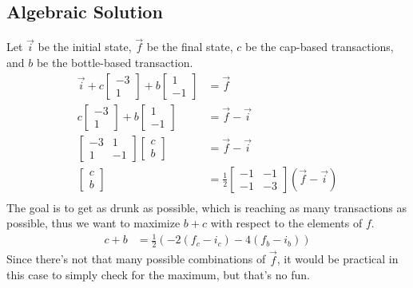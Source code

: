 \documentclass[letterpaper, 12pt]{article}
\begin{document}
\subsection{Algebraic Solution}
Let $\vec{i}$ be the initial state, $\vec{f}$ be the final state, $c$ be the cap-based transactions, and $b$ be the bottle-based transaction.
\begin{align*}
    \vec{i}
    + c
    \begin{bmatrix}
        -3\\
        1
    \end{bmatrix}
    + b
    \begin{bmatrix}
        1\\
        -1
    \end{bmatrix}
    &=
    \vec{f}\\
    c
    \begin{bmatrix}
        -3\\
        1
    \end{bmatrix}
    + b
    \begin{bmatrix}
        1\\
        -1
    \end{bmatrix}
    &=
    \vec{f} - \vec{i}\\
    \begin{bmatrix}
        -3 & 1\\
         1 &-1
    \end{bmatrix}
    \begin{bmatrix}
        c\\
        b
    \end{bmatrix}
    &=
    \vec{f} - \vec{i}\\
    \begin{bmatrix}
        c\\
        b
    \end{bmatrix}
    &=
    \frac{1}{2}
    \begin{bmatrix}
        -1 &-1\\
        -1 &-3
    \end{bmatrix}
    (\vec{f} - \vec{i})\\
\end{align*}
The goal is to get as drunk as possible, which is reaching as many transactions as possible, thus we want to maximize $b + c$ with respect to the elements of $f$.
\begin{align*}
    c + b &= \frac{1}{2}(-2(f_c - i_c) - 4(f_b - i_b))
\end{align*}
Since there's not that many possible combinations of $\vec{f}$, it would be practical in this case to simply check for the maximum, but that's no fun.
\end{document}
